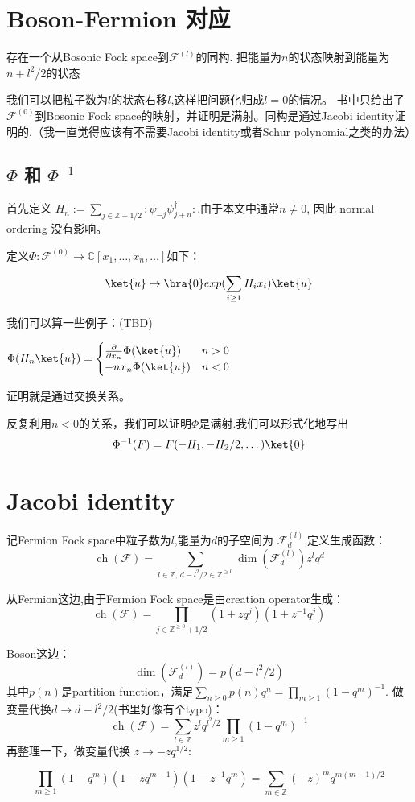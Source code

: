 \section{Boson-Fermion 对应}
\begin{theorem}
    存在一个从Bosonic Fock space到$\mathcal{F}^{(l)}$的同构. 把能量为$n$的状态映射到能量为$n+l^2/2$的状态
\end{theorem}
我们可以把粒子数为$l$的状态右移$l$,这样把问题化归成$l=0$的情况。
书中只给出了$\mathcal{F}^{(0)}$到Bosonic Fock space的映射，并证明是满射。同构是通过Jacobi identity证明的.（我一直觉得应该有不需要Jacobi identity或者Schur polynomial之类的办法）
\subsection{$\Phi$ 和 $\Phi^{-1}$}
首先定义 $H_n:=\sum_{j\in \mathbb{Z}+1/2}:\mathrel{\psi_{-j}\psi^{\dagger}_{j+n}}:$.由于本文中通常$n\not=0$, 因此 normal ordering 没有影响。

定义$\Phi:\mathcal{F}^{(0)}\rightarrow \mathbb{C}[x_1,\dots,x_n,\dots]$如下：

\[\ket{u}\mapsto\bra{0}exp(\sum_{i\ge 1}H_ix_i)\ket{u}\]

我们可以算一些例子：(TBD)

\begin{theorem}
    $\Phi(H_n\ket{u})=\begin{cases}
\frac{\partial}{\partial x_n}\Phi(\ket{u})& n>0\\
-nx_n\Phi(\ket{u})& n<0
\end{cases}$
\end{theorem}
证明就是通过交换关系。

反复利用$n<0$的关系，我们可以证明$\Phi$是满射.我们可以形式化地写出
$$\Phi^{-1}(F)=F(-H_1,-H_2/2,\dots)\ket{0}$$
\section{Jacobi identity}
记Fermion Fock space中粒子数为$l$,能量为$d$的子空间为
$\mathcal{F}^{(l)}_d$,定义生成函数：
\[
    \operatorname{ch}(\mathcal{F})=\sum_{l\in\mathbb{Z},\,d-l^2/2\in\mathbb{Z}^{\ge 0}}\operatorname{dim}(\mathcal{F}^{(l)}_d)z^lq^d
\]

从Fermion这边,由于Fermion Fock space是由creation operator生成：
\[
    \operatorname{ch}(\mathcal{F})=\prod_{j\in\mathbb{Z}^{\ge 0}+1/2}(1+zq^j)(1+z^{-1}q^j)
\]

Boson这边：
\[
    \operatorname{dim}(\mathcal{F}^{(l)}_d)=p(d-l^2/2)
\]
其中$p(n)$是partition function，满足$\sum_{n\ge 0}p(n)q^n=\prod_{m\ge 1}(1-q^m)^{-1}$.
做变量代换$d\rightarrow d-l^2/2$(书里好像有个typo)：
\[
    \operatorname{ch}(\mathcal{F})=\sum_{l\in\mathbb{Z}}z^lq^{l^2/2}\prod_{m\ge 1}(1-q^m)^{-1}
\]
再整理一下，做变量代换 $z\rightarrow -zq^{1/2}$:

\[
    \prod_{m\ge 1}(1-q^m)(1-zq^{m-1})(1-z^{-1}q^m)=\sum_{m\in\mathbb{Z}}(-z)^mq^{m(m-1)/2}
\]
